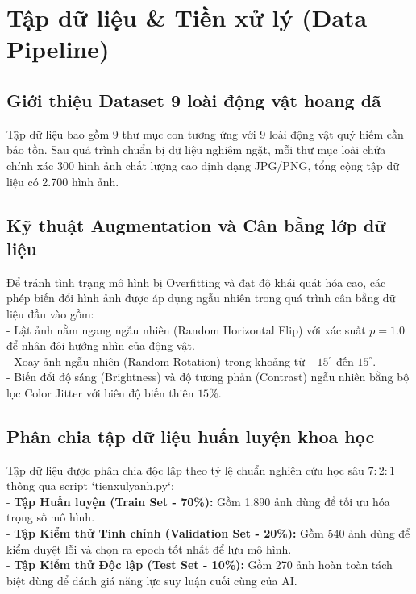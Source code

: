\documentclass[12pt,a4paper]{report}
\begin{document}
\chapter{Tập dữ liệu & Tiền xử lý (Data Pipeline)}

\section{Giới thiệu Dataset 9 loài động vật hoang dã}
Tập dữ liệu bao gồm 9 thư mục con tương ứng với 9 loài động vật quý hiếm cần bảo tồn. Sau quá trình chuẩn bị dữ liệu nghiêm ngặt, mỗi thư mục loài chứa chính xác 300 hình ảnh chất lượng cao định dạng JPG/PNG, tổng cộng tập dữ liệu có 2.700 hình ảnh.

\section{Kỹ thuật Augmentation và Cân bằng lớp dữ liệu}
Để tránh tình trạng mô hình bị Overfitting và đạt độ khái quát hóa cao, các phép biến đổi hình ảnh được áp dụng ngẫu nhiên trong quá trình cân bằng dữ liệu đầu vào gồm:\\

\noindent - Lật ảnh nằm ngang ngẫu nhiên (Random Horizontal Flip) với xác suất $p=1.0$ để nhân đôi hướng nhìn của động vật.\\[0.15cm]
\noindent - Xoay ảnh ngẫu nhiên (Random Rotation) trong khoảng từ $-15^\circ$ đến $15^\circ$.\\[0.15cm]
\noindent - Biến đổi độ sáng (Brightness) và độ tương phản (Contrast) ngẫu nhiên bằng bộ lọc Color Jitter với biên độ biến thiên $15\%$.

\section{Phân chia tập dữ liệu huấn luyện khoa học}
Tập dữ liệu được phân chia độc lập theo tỷ lệ chuẩn nghiên cứu học sâu $7:2:1$ thông qua script `tienxulyanh.py`:\\

\noindent - \textbf{Tập Huấn luyện (Train Set - 70\%):} Gồm 1.890 ảnh dùng để tối ưu hóa trọng số mô hình.\\[0.15cm]
\noindent - \textbf{Tập Kiểm thử Tinh chỉnh (Validation Set - 20\%):} Gồm 540 ảnh dùng để kiểm duyệt lỗi và chọn ra epoch tốt nhất để lưu mô hình.\\[0.15cm]
\noindent - \textbf{Tập Kiểm thử Độc lập (Test Set - 10\%):} Gồm 270 ảnh hoàn toàn tách biệt dùng để đánh giá năng lực suy luận cuối cùng của AI.
\newpage
\end{document}
